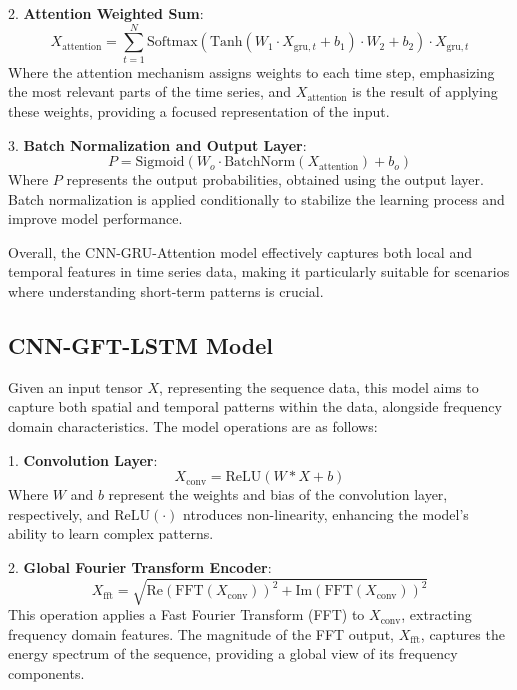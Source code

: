 \documentclass{mcmthesis}
\begin{document}
2. \textbf{Attention Weighted Sum}:
\begin{equation}
    X_{\text{attention}} = \sum_{t=1}^{N} \text{Softmax}\left(\text{Tanh}(W_1 \cdot X_{\text{gru},t} + b_1) \cdot W_2 + b_2\right) \cdot X_{\text{gru},t}
\end{equation}
Where the attention mechanism assigns weights to each time step, emphasizing the most relevant parts of the time series, %
and $X_{\text{attention}}$ is the result of applying these weights, providing a focused representation of the input.

3. \textbf{Batch Normalization and Output Layer}:
\begin{equation}
    P = \text{Sigmoid}\left(W_o \cdot \text{BatchNorm}(X_{\text{attention}}) + b_o\right)
\end{equation}
Where $P$ represents the output probabilities, obtained using the output layer. Batch normalization is applied conditionally %
to stabilize the learning process and improve model performance.

Overall, the CNN-GRU-Attention model effectively captures both local and temporal features in time series data, %
making it particularly suitable for scenarios where understanding short-term patterns is crucial.



\subsection{CNN-GFT-LSTM Model}

Given an input tensor $X$, representing the sequence data, this model aims to capture both spatial and temporal %
patterns within the data, alongside frequency domain characteristics. The model operations are as follows:

1. \textbf{Convolution Layer}:
\begin{equation}
    X_{\text{conv}} = \text{ReLU}(W * X + b)
\end{equation}
Where $W$ and $b$ represent the weights and bias of the convolution layer, respectively, and $\text{ReLU}(\cdot)$ %
ntroduces non-linearity, enhancing the model's ability to learn complex patterns.

2. \textbf{Global Fourier Transform Encoder}:
\begin{equation}
    X_{\text{fft}} = \sqrt{\text{Re}(\text{FFT}(X_{\text{conv}}))^2 + \text{Im}(\text{FFT}(X_{\text{conv}}))^2}
\end{equation}
This operation applies a Fast Fourier Transform (FFT) to $X_{\text{conv}}$, extracting frequency domain features. %
The magnitude of the FFT output, $X_{\text{fft}}$, captures the energy spectrum of the sequence, providing a global %
view of its frequency components.
\end{document}
